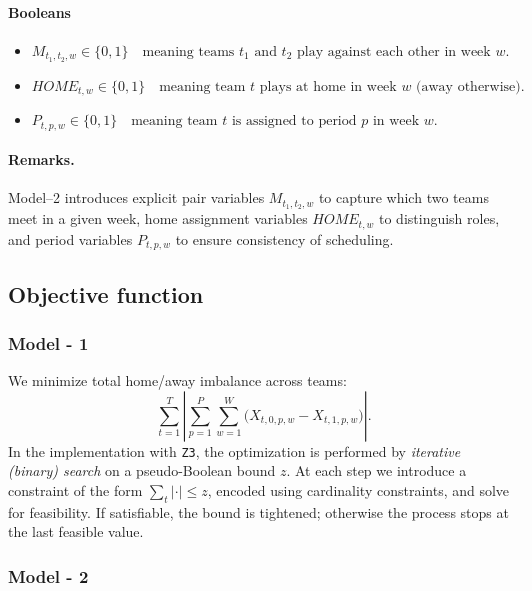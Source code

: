 \paragraph{Booleans}

\begin{itemize}
    \item  $ M_{t_1,t_2,w} \in \{0,1\} \quad\text{meaning teams $t_1$ and $t_2$ play against each other in week $w$}. $
    \item $HOME_{t,w} \in \{0,1\} \quad\text{meaning team $t$ plays at home in week $w$ (away otherwise)}.$
    \item $P_{t,p,w} \in \{0,1\} \quad\text{meaning team $t$ is assigned to period $p$ in week $w$}.$
\end{itemize}


\paragraph{Remarks.}

Model--2 introduces explicit pair variables \(M_{t_1,t_2,w}\) to capture
which two teams meet in a given week, home assignment variables
\(HOME_{t,w}\) to distinguish roles, and period variables
\(P_{t,p,w}\) to ensure consistency of scheduling.


\subsection{Objective function}

\subsubsection{Model - 1}

We minimize total home/away imbalance across teams:
\[
\;\; \sum_{t=1}^{T} \left| 
\sum_{p=1}^{P}\sum_{w=1}^{W} \big( X_{t,0,p,w} - X_{t,1,p,w} \big)
\right|.
\]
In the implementation with \texttt{Z3}, the optimization is performed by 
\emph{iterative (binary) search} on a pseudo-Boolean bound \(z\). 
At each step we introduce a constraint of the form 
\(\sum_t \lvert \cdot \rvert \leq z\), encoded using cardinality 
constraints, and solve for feasibility. If satisfiable, the bound 
is tightened; otherwise the process stops at the last feasible value.

\subsubsection{Model - 2 }

